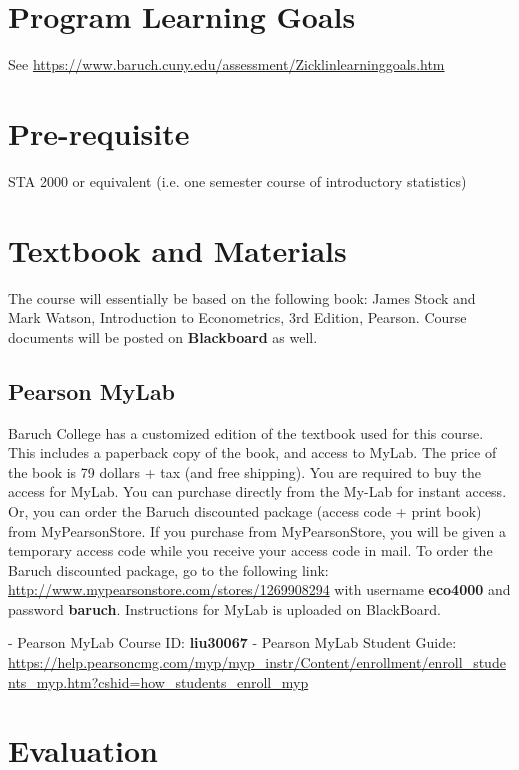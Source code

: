 \documentclass[12]{article}
\begin{document}
\section*{Program Learning Goals}

See \url{https://www.baruch.cuny.edu/assessment/Zicklinlearninggoals.htm}


\section*{Pre-requisite}
STA 2000 or equivalent (i.e. one semester course of introductory statistics)

\section*{Textbook and Materials}
The course will essentially be based on the following book: James Stock and Mark Watson, Introduction to Econometrics, 3rd Edition, Pearson.
\newline
\newline
Course documents will be posted on \textbf{Blackboard} as well.

\subsection*{Pearson MyLab}
Baruch College has a customized  edition of the textbook used for this course.  This includes a paperback copy of the book, and access to MyLab. The price of the book is 79 dollars + tax (and free shipping). You are required to buy the access for MyLab. You can purchase directly from the My-Lab for instant access. Or, you can order the Baruch discounted package (access code + print book) from MyPearsonStore. If you purchase from MyPearsonStore, you will be given a temporary access code while you receive your access code in mail. To order the Baruch discounted package, go to the
following link: \url{http://www.mypearsonstore.com/stores/1269908294} with username \textbf{eco4000} and password \textbf{baruch}. Instructions for MyLab is uploaded on BlackBoard.

- Pearson MyLab Course ID: \textbf{liu30067}
\newline
- Pearson MyLab Student Guide: \url{https://help.pearsoncmg.com/myp/myp_instr/Content/enrollment/enroll_students_myp.htm?cshid=how_students_enroll_myp}


\section*{Evaluation}
\end{document}
